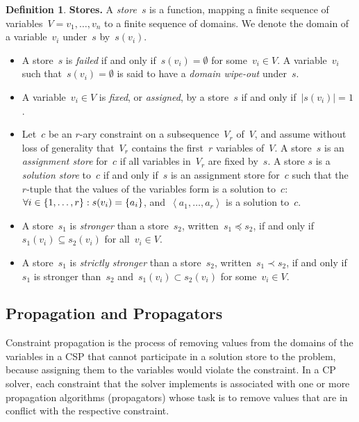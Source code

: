 \documentclass[a4paper,11pt]{article}
\theoremstyle{definition}
\newtheorem{definition}{Definition}
\newcommand{\Dom}[1]{\text{dom}({#1})}
\numberwithin{equation}{section}
\begin{document}
\begin{definition}
  \textbf{Stores.} A \emph{store}~$s$ is a function, mapping a finite sequence of
  variables~$V = v_1, \ldots, v_n$ to a finite sequence of domains. We denote the domain of
  a variable~$v_i$ under~$s$ by~$s(v_i)$.%
  \begin{itemize}
    \item A store~$s$ is \emph{failed} if and only if~$s(v_i) = \emptyset$ for some~$v_i \in V$.
      A variable~$v_i$ such that~$s(v_i) = \emptyset$ is said to have
      a \emph{domain wipe-out} under~$s$.

    \item   A variable~$v_i \in V$ is \emph{fixed}, or \emph{assigned},
      by a store~$s$ if and only if~$|s(v_i)| = 1$.

    \item Let~$c$ be an $r$-ary constraint on a subsequence~$V_r$ of~$V$,
      and assume without loss of generality that~$V_r$
      contains the first~$r$ variables of~$V$.
      A store~$s$ is an \emph{assignment store} for~$c$ if all variables
      in~$V_r$ are fixed by~$s$.
      A store $s$ is a \emph{solution store}
      to~$c$ if and only if~$s$ is an assignment store for~$c$ such that
      the~$r$-tuple that the values of the variables form is a solution
      to~$c$:
      $\forall i \in \left\{1,\ldots,r\right\}: s(v_i) = \left\{a_i\right\}$,
      and~$\left<a_1,\ldots,a_r\right>$ is a solution to~$c$.

    \item A store~$s_1$ is \emph{stronger} than a store~$s_2$,
      written~$s_1 \preceq s_2$, if and only if~$s_1(v_i) \subseteq s_2(v_i)$
      for all~$v_i \in V$.

    \item A store~$s_1$ is \emph{strictly stronger} than a store~$s_2$,
      written~$s_1 \prec s_2$, if and only if~$s_1$ is stronger than~$s_2$
      and~$s_1(v_i) \subset s_2(v_i)$ for some~$v_i \in V$.

  \end{itemize}

\end{definition}

\subsection{Propagation and Propagators}
\label{bg:propagation}

Constraint propagation is the process of removing values from the domains
of the variables in a CSP that cannot participate in a solution store to the
problem, because assigning them to the variables would violate the constraint.
In a CP solver, each constraint that the solver implements is
associated with
one or more propagation algorithms (propagators) whose task is to remove
values that are in conflict with the respective constraint.
\end{document}
